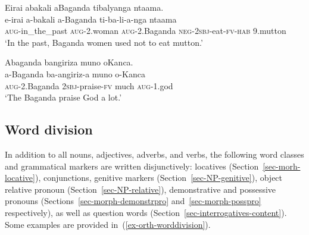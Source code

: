 \ea \label{ex-orth-capitalisationC}
\begin{xlist}
\ex 
	\glll Eirai abakali aBaganda tibalyanga ntaama.\\
	  e-irai a-bakali a-Baganda ti-ba-li-a-nga ntaama\\
		 \textsc{aug}-in\_the\_past \textsc{aug}-2.woman \textsc{aug}-2.Baganda \textsc{neg}-\textsc{2sbj}-eat-\textsc{fv}-\textsc{hab} 9.mutton\\
\glt ‘In the past, Baganda women used not to eat mutton.’ 

\ex
	\glll Abaganda bangiriza muno oKanca.\\
	  a-Baganda ba-angiriz-a muno o-Kanca\\
		\textsc{aug}-2.Baganda \textsc{2sbj}-praise-\textsc{fv} much \textsc{aug}-1.god\\
\glt ‘The Baganda praise God a lot.'
\end{xlist}
\z

\subsection{Word division} \label{sec-orthography-worddivision}

In addition to all nouns, adjectives, adverbs, and verbs, the following word classes and grammatical markers are written disjunctively: locatives (Section~\ref{sec-morh-locative}), conjunctions, genitive markers (Section~\ref{sec-NP-genitive}), object relative pronoun (Section~\ref{sec-NP-relative}), demonstrative and possessive pronouns (Sections~\ref{sec-morph-demonstrpro} and~\ref{sec-morph-posspro} respectively), as well as question words (Section~\ref{sec-interrogatives-content}). 
Some examples are provided in~(\ref{ex-orth-worddivision}).

